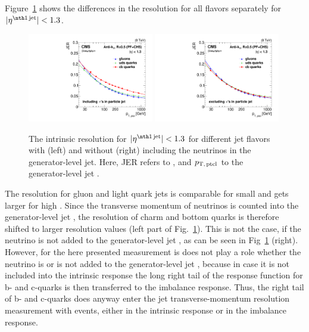Figure~\ref{res:fig:ResolutionDifferences} shows the differences in the resolution for all flavors separately for $|\etafirstjet|<1.3$.
\begin{figure}[tp]
  \centering
      \includegraphics[width=0.49\textwidth]{figures/resolution/systematicUncertainties/Resolution_for_1_eta_bin_FlavorUncertainty_RMS99_wNeutrinos.pdf}
      \includegraphics[width=0.49\textwidth]{figures/resolution/systematicUncertainties/Resolution_for_1_eta_bin_FlavorUncertainty_RMS99.pdf}
  \caption{The intrinsic resolution \jerintr for $|\etafirstjet| < 1.3$ for different jet flavors with (left) and without (right) including the neutrinos in the generator-level jet.
           Here, JER refers to \jerintr, and $p_{\text{T,\,ptcl}}$ to the generator-level jet \pt. }  
  \label{res:fig:ResolutionDifferences}
\end{figure}
The resolution for gluon and light quark jets is comparable for small \ptgamma and gets larger for high \ptgamma.
Since the transverse momentum of neutrinos is counted into the generator-level jet \pt, the resolution of charm and bottom quarks is therefore shifted to larger resolution values (left part of Fig.~\ref{res:fig:ResolutionDifferences}).
This is not the case, if the neutrino \pt is not added to the generator-level jet \pt, as can be seen in Fig~\ref{res:fig:ResolutionDifferences} (right).
However, for the here presented measurement is does not play a role whether the neutrino \pt is or is not added to the generator-level jet \pt, because in case it is not included into the intrinsic response the long right tail of the response function for b- and c-quarks is then transferred to the imbalance response.
Thus, the right tail of b- and c-quarks does anyway enter the jet transverse-momentum resolution measurement with \GAMJET events, either in the intrinsic response or in the imbalance response.

